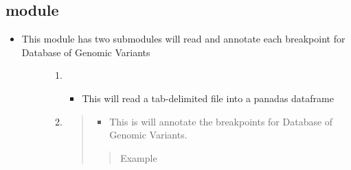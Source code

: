 \documentclass[letterpaper,10pt,english]{sphinxmanual}
\begin{document}
\subsection{ module}
\label{\detokenize{iAnnotateSV:annotatefordgv-module}}\begin{itemize}
\item {} \begin{description}
\item[{This module has two submodules will read and annotate each breakpoint for Database of Genomic Variants}] \leavevmode\begin{enumerate}
\item {} 
\begin{itemize}
\item {} 
This will read a tab-delimited file into a panadas dataframe

\end{itemize}

\item {} 
\begin{quote}
\begin{itemize}
\item {} 
This is will annotate the breakpoints for Database of Genomic Variants.

\end{itemize}
\begin{quote}\begin{description}
\item[{Example}] \leavevmode
{}

\end{description}\end{quote}
\end{quote}

\end{enumerate}

\end{description}

\end{itemize}
\end{document}
